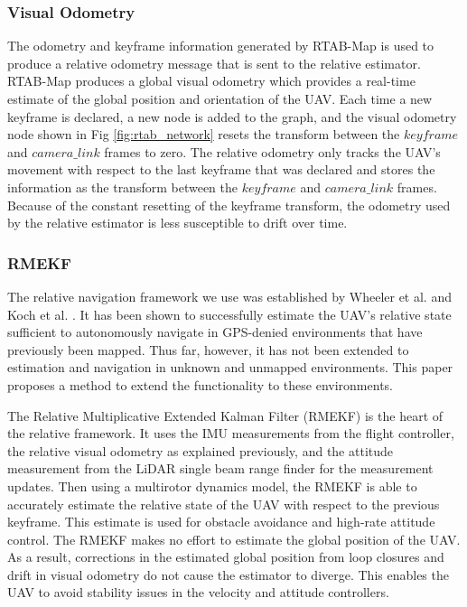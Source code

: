 \documentclass[letterpaper, 10 pt, conference]{ieeeconf}  %
\begin{document}
\subsubsection{Visual Odometry} \label{vis_odom}

The odometry and keyframe information generated by RTAB-Map is used to produce a relative odometry message that is sent to the relative estimator. RTAB-Map produces a global visual odometry which provides a real-time estimate of the global position and orientation of the UAV. Each time a new keyframe is declared, a new node is added to the graph, and the visual odometry node shown in Fig \ref{fig:rtab_network} resets the transform between the $\mathit{keyframe}$ and $\mathit{camera\_link}$ frames to zero. The relative odometry only tracks the UAV's movement with respect to the last keyframe that was declared and stores the information as the transform between the $\mathit{keyframe}$ and $\mathit{camera\_link}$ frames. Because of the constant resetting of the keyframe transform, the odometry used by the relative estimator is less susceptible to drift over time.

\subsubsection{RMEKF}

The relative navigation framework we use was established by Wheeler et al. \cite{Wheeler2017}\cite{Wheeler2018} and Koch et al. \cite{Koch2017}. It has been shown to successfully estimate the UAV's relative state sufficient to autonomously navigate in GPS-denied environments that have previously been mapped. Thus far, however, it has not been extended to estimation and navigation in unknown and unmapped environments. This paper proposes a method to extend the functionality to these environments.

The Relative Multiplicative Extended Kalman Filter (RMEKF) is the heart of the relative framework. It uses the IMU measurements from the flight controller, the relative visual odometry as explained previously, and the attitude measurement from the LiDAR single beam range finder for the measurement updates. Then using a multirotor dynamics model, the RMEKF is able to accurately estimate the relative state of the UAV with respect to the previous keyframe. This estimate is used for obstacle avoidance and high-rate attitude control. The RMEKF makes no effort to estimate the global position of the UAV. As a result, corrections in the estimated global position from loop closures and drift in visual odometry do not cause the estimator to diverge. This enables the UAV to avoid stability issues in the velocity and attitude controllers.
\end{document}
